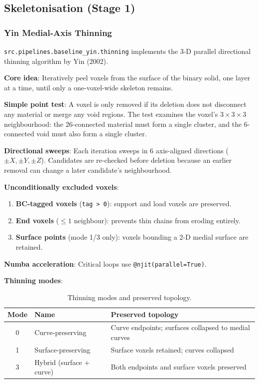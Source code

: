 \documentclass[a4paper, 11pt, openany]{report}
\begin{document}
\subsection{Skeletonisation (Stage 1)}
\label{sec:alg-skeleton}

\subsubsection{Yin Medial-Axis Thinning}

\texttt{src.pipelines.baseline\_yin.thinning} implements the 3-D parallel
directional thinning algorithm by Yin (2002).

\textbf{Core idea}: Iteratively peel voxels from the surface of the binary
solid, one layer at a time, until only a one-voxel-wide skeleton remains.

\textbf{Simple point test}: A voxel is only removed if its deletion does not
disconnect any material or merge any void regions.  The test examines the
voxel's $3 \times 3 \times 3$ neighbourhood: the 26-connected material must
form a single cluster, and the 6-connected void must also form a single cluster.

\textbf{Directional sweeps}: Each iteration sweeps in 6 axis-aligned directions
($\pm X, \pm Y, \pm Z$).  Candidates are re-checked before deletion because
an earlier removal can change a later candidate's neighbourhood.

\textbf{Unconditionally excluded voxels}:
\begin{enumerate}[nosep]
    \item \textbf{BC-tagged voxels} (\texttt{tag > 0}): support and load voxels
          are preserved.
    \item \textbf{End voxels} ($\le 1$ neighbour): prevents thin chains from
          eroding entirely.
    \item \textbf{Surface points} (mode 1/3 only): voxels bounding a 2-D medial
          surface are retained.
\end{enumerate}

\textbf{Numba acceleration}: Critical loops use \texttt{@njit(parallel=True)}.

\textbf{Thinning modes}:

\begin{table}[htbp]
\caption{Thinning modes and preserved topology.}
\label{tab:thinning-modes}
\centering
\begin{tabularx}{\textwidth}{clX}
\toprule
Mode & Name & Preserved topology \\
\midrule
0 & Curve-preserving & Curve endpoints; surfaces collapsed to medial curves \\
1 & Surface-preserving & Surface voxels retained; curves collapsed \\
3 & Hybrid (surface + curve) & Both endpoints and surface voxels preserved \\
\bottomrule
\end{tabularx}
\end{table}
\end{document}
